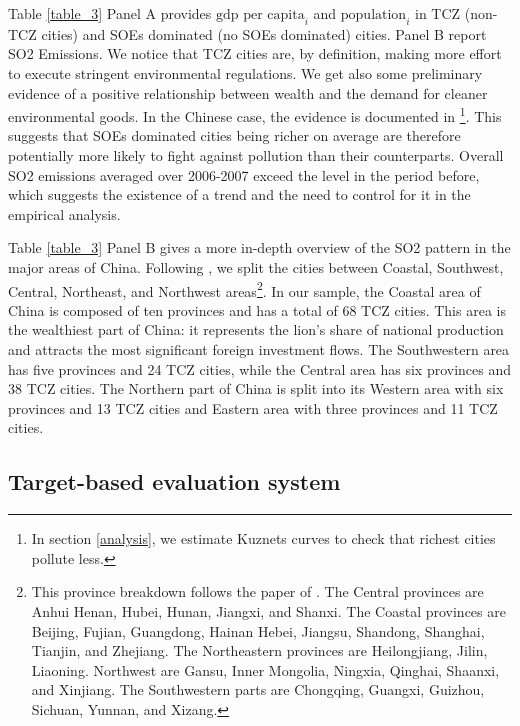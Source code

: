 \documentclass[12pt]{article}
\begin{document}
Table \ref{table_3} Panel A provides $\text{gdp per capita}_i$ and $\text{population}_i$ in TCZ (non-TCZ cities) and SOEs dominated (no SOEs dominated) cities. Panel B report SO2 Emissions. We notice that TCZ cities are, by definition, making more effort to execute stringent environmental regulations. We get also some preliminary evidence of a positive relationship between wealth and the demand for cleaner environmental goods. In the Chinese case, the evidence is documented in \cite{Hering2014-af}\footnote{In section \ref{analysis}, we estimate Kuznets curves to check that richest cities pollute less.}. This suggests that SOEs dominated cities being richer on average are therefore potentially more likely to fight against pollution  than their counterparts. Overall SO2 emissions averaged over 2006-2007 exceed the level in the period before, which suggests the existence of a trend and the need to control for it in the empirical analysis. 


Table \ref{table_3} Panel B gives a more in-depth overview of the SO2 pattern in the major areas of China. Following \cite{Wu2017-bl}, we split the cities between Coastal, Southwest, Central, Northeast, and Northwest areas\footnote{This province breakdown follows the paper of \cite{Wu2017-bl}. The Central provinces are Anhui Henan, Hubei, Hunan, Jiangxi, and Shanxi. The Coastal provinces are Beijing, Fujian, Guangdong, Hainan Hebei, Jiangsu, Shandong, Shanghai, Tianjin, and Zhejiang. The Northeastern provinces are Heilongjiang, Jilin, Liaoning. Northwest are Gansu, Inner Mongolia, Ningxia, Qinghai, Shaanxi, and Xinjiang. The Southwestern parts are Chongqing, Guangxi, Guizhou, Sichuan, Yunnan, and Xizang.}. In our sample, the Coastal area of China is composed of ten provinces and has a total of 68 TCZ cities. This area is the wealthiest part of China: it represents the lion's share of national production and attracts the most significant foreign investment flows. The Southwestern area has five provinces and 24 TCZ cities, while the Central area has six provinces and 38 TCZ cities. The Northern part of China is split into its Western area with six provinces and 13 TCZ cities and Eastern area with three provinces and 11 TCZ cities. 



\subsection{Target-based evaluation system}
\end{document}
